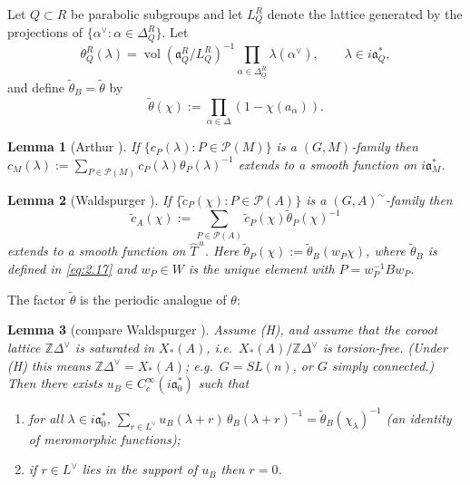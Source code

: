 \documentclass[12pt,letterpaper]{article}
\numberwithin{equation}{section}
\theoremstyle{plain}
\newtheorem{lemma}{Lemma}[section]
\theoremstyle{remark}
\theoremstyle{plain}
\theoremstyle{definition}
\theoremstyle{remark}
\theoremstyle{remark}
\newcommand{\cP}{\mathcal{P}}
\newcommand{\fa}{\mathfrak{a}}
\newcommand{\Thu}{\widehat{T}^{\,u}}
\DeclareMathOperator{\vol}{vol}
\begin{document}
Let $Q\subset R$ be parabolic subgroups and let $L_Q^R$ denote the lattice generated by the projections of $\{\alpha^\vee:\alpha\in\Delta_Q^R\}$. Let
\begin{equation}\label{eq:2.16}
\theta_Q^R(\lambda)=\vol(\fa_Q^R/L_Q^R)^{-1}\prod_{\alpha\in\Delta_Q^R}\lambda(\alpha^\vee),\qquad\lambda\in i\fa_Q^*,
\end{equation}
and define $\tilde\theta_B=\tilde\theta$ by
\begin{equation}\label{eq:2.17}
\tilde\theta(\chi):=\prod_{\alpha\in\Delta}(1-\chi(a_\alpha)).
\end{equation}

\begin{lemma}[Arthur {\cite[Lemma~6.2]{Ar81}}]\label{lem:2.6}
If $\{c_P(\lambda):P\in\cP(M)\}$ is a $(G,M)$-family then $c_M(\lambda):=\sum_{P\in\cP(M)}c_P(\lambda)\theta_P(\lambda)^{-1}$ extends to a smooth function on $i\fa^*_M$.
\end{lemma}

\begin{lemma}[Waldspurger {\cite[\S7]{Wa89a}}]\label{lem:2.7}
If $\{\tilde c_P(\chi):P\in\cP(A)\}$ is a $(G,A)^\sim$-family then
\[
\tilde c_A(\chi):=\sum_{P\in\cP(A)}\tilde c_P(\chi)\tilde\theta_P(\chi)^{-1}
\]
extends to a smooth function on $\Thu$. Here $\tilde\theta_P(\chi):=\tilde\theta_B(w_P\chi)$, where $\tilde\theta_B$ is defined in \eqref{eq:2.17} and $w_P\in W$ is the unique element with $P=w_P^{-1}Bw_P$.
\end{lemma}

The factor $\tilde\theta$ is the periodic analogue of $\theta$:

\begin{lemma}[compare Waldspurger {\cite[II.7.1]{Wa89a}}]\label{lem:2.8}
Assume (H), and assume that the coroot lattice $\mathbb{Z}\Delta^\vee$ is saturated in $X_*(A)$, i.e.\ $X_*(A)/\mathbb{Z}\Delta^\vee$ is torsion-free. (Under (H) this means $\mathbb{Z}\Delta^\vee=X_*(A)$; e.g.\ $G=SL(n)$, or $G$ simply connected.) Then there exists $u_B\in C^\infty_c(i\fa_0^*)$ such that
\begin{enumerate}[label=(\alph*)]
\item for all $\lambda\in i\fa_0^*$, $\displaystyle\sum_{r\in L^\vee}u_B(\lambda+r)\,\theta_B(\lambda+r)^{-1}=\tilde\theta_B(\chi_\lambda)^{-1}$ (an identity of meromorphic functions);
\item if $r\in L^\vee$ lies in the support of $u_B$ then $r=0$.
\end{enumerate}
\end{lemma}
\end{document}
